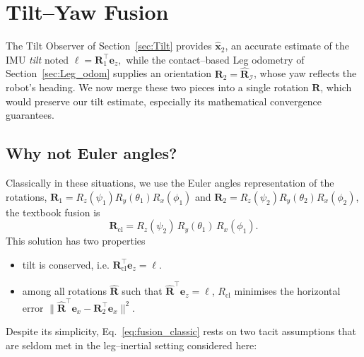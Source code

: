 \documentclass[10pt,twocolumn]{ICCAS}
\begin{document}
\section{Tilt--Yaw Fusion}
\label{sec:axisAgnostic}

The Tilt Observer of Section~\ref{sec:Tilt} provides $\hat{\boldsymbol{x}}_{2}$,  an accurate
estimate of the IMU \emph{tilt} noted
\(
  \boldsymbol{\ell}=\boldsymbol{R}_{1}^{\top}\boldsymbol{e}_{z},
\)
while the contact–based Leg odometry of
Section~\ref{sec:Leg_odom} supplies an orientation \(\boldsymbol{R}_{2} = \hat{\boldsymbol{R}}_{\mathcal{I}}\), whose
yaw reflects the robot's heading.  We now merge these two pieces into a single rotation \(\boldsymbol{R}\), which would preserve our tilt estimate, especially its mathematical convergence guarantees.

\subsection{Why not Euler angles?}

Classically in these situations, we use the Euler angles representation of the rotations,
\(\boldsymbol{R}_{1}=R_{z}(\psi_{1})R_{y}(\theta_{1})R_{x}(\phi_{1})\) and
\(\boldsymbol{R}_{2}=R_{z}(\psi_{2})R_{y}(\theta_{2})R_{x}(\phi_{2})\),
the textbook fusion is
\begin{equation}
  \boldsymbol{R}_{\mathrm{cl}}
  =R_{z}(\psi_{2})\,R_{y}(\theta_{1})\,R_{x}(\phi_{1}).
  \label{eq:fusion_classic}
\end{equation}
This solution has two properties
\begin{itemize} 
\item tilt is conserved, i.e. 
\(\boldsymbol{R}_{\mathrm{cl}}^{\top}\boldsymbol{e}_{z}=\boldsymbol{\ell}\).
\item among all rotations \(\hat{\boldsymbol{R}}\) such that
\(\hat{\boldsymbol{R}}^{\top}\boldsymbol{e}_{z}=\boldsymbol{\ell}\),
\(R_{\mathrm{cl}}\) minimises the horizontal error
\(
  \|
    \hat{\boldsymbol{R}}^{\top}\boldsymbol{e}_{x}-\boldsymbol{R}_{2}^{\top}\boldsymbol{e}_{x}
  \|^{2}.
\)
\end{itemize}


Despite its simplicity, Eq.~\eqref{eq:fusion_classic} rests on two tacit
assumptions that are seldom met in the leg–inertial setting considered
here:
\end{document}
